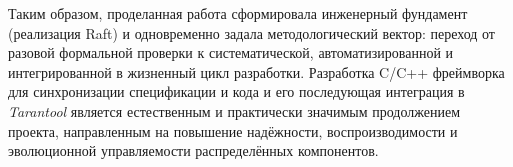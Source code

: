 Таким образом, проделанная работа сформировала инженерный фундамент (реализация
Raft) и одновременно задала методологический вектор: переход от разовой
формальной проверки к систематической, автоматизированной и интегрированной в
жизненный цикл разработки. Разработка C/C++ фреймворка для синхронизации
спецификации и кода и его последующая интеграция в \textit{Tarantool} является
естественным и практически значимым продолжением проекта, направленным на
повышение надёжности, воспроизводимости и эволюционной управляемости
распределённых компонентов.

